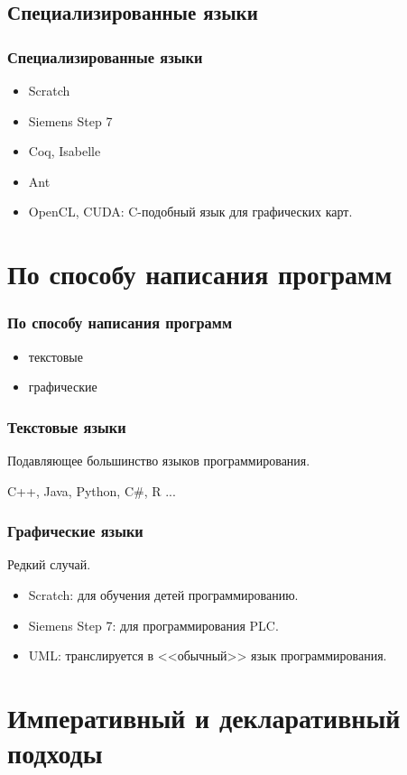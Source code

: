 \documentclass[9pt,pdf]{beamer}
\begin{document}
\subsection{Специализированные языки}

\begin{frame}
	\frametitle{Специализированные языки}
	\begin{itemize}
		\item Scratch
		\item Siemens Step 7
		\item Coq, Isabelle
		\item Ant
		\item OpenCL, CUDA: C-подобный язык для графических карт.
	\end{itemize}
\end{frame}

\section{По способу написания программ}

\begin{frame}
	\frametitle{По способу написания программ}
	\begin{itemize}
		\item текстовые
		\item графические
	\end{itemize}
\end{frame}

\begin{frame}
	\frametitle{Текстовые языки}
	Подавляющее большинство языков программирования.
	
	C++, Java, Python, C\#, R ...
\end{frame}

\begin{frame}
	\frametitle{Графические языки}
	Редкий случай.
	\begin{itemize}
		\item Scratch: для обучения детей программированию.
		\item Siemens Step 7: для программирования PLC.
		\item UML: транслируется в <<обычный>> язык программирования.
	\end{itemize}
\end{frame}

\section{Императивный и декларативный подходы}
\end{document}
